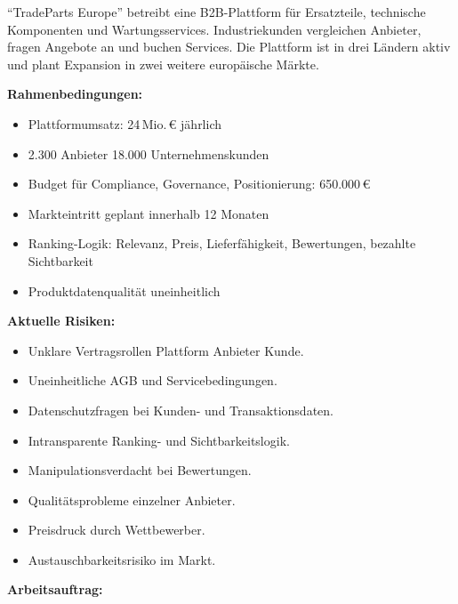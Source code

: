 \documentclass[11pt,a4paper,oneside]{article}
\begin{document}
\begin{infobox}
``TradeParts Europe'' betreibt eine B2B-Plattform für Ersatzteile, technische Komponenten und Wartungsservices. Industriekunden vergleichen Anbieter, fragen Angebote an und buchen Services. Die Plattform ist in drei Ländern aktiv und plant Expansion in zwei weitere europäische Märkte.

\smallskip
\textbf{Rahmenbedingungen:}
\begin{itemize}
  \item Plattformumsatz: 24\,Mio.\,\euro{} jährlich
  \item 2.300 Anbieter \textperiodcentered{} 18.000 Unternehmenskunden
  \item Budget für Compliance, Governance, Positionierung: 650.000\,\euro
  \item Markteintritt geplant innerhalb 12 Monaten
  \item Ranking-Logik: Relevanz, Preis, Lieferfähigkeit, Bewertungen, bezahlte Sichtbarkeit
  \item Produktdatenqualität uneinheitlich
\end{itemize}

\smallskip
\textbf{Aktuelle Risiken:}
\begin{itemize}
  \item Unklare Vertragsrollen Plattform \textperiodcentered{} Anbieter \textperiodcentered{} Kunde.
  \item Uneinheitliche AGB und Servicebedingungen.
  \item Datenschutzfragen bei Kunden- und Transaktionsdaten.
  \item Intransparente Ranking- und Sichtbarkeitslogik.
  \item Manipulationsverdacht bei Bewertungen.
  \item Qualitätsprobleme einzelner Anbieter.
  \item Preisdruck durch Wettbewerber.
  \item Austauschbarkeitsrisiko im Markt.
\end{itemize}
\end{infobox}

\noindent\textbf{Arbeitsauftrag:}
\end{document}
